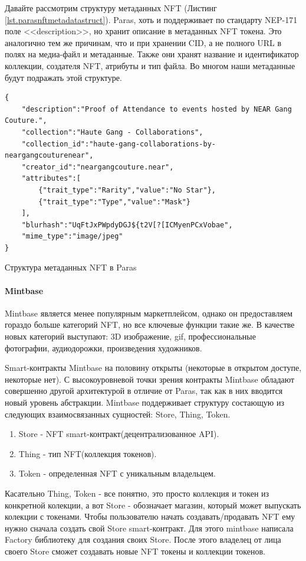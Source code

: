 Давайте рассмотрим структуру метаданных NFT (Листинг {\color{blue}\ref{lst.parasnftmetadatastruct}}). Paras, хоть и поддерживает по стандарту NEP-171 поле <<description>>, но хранит описание в метаданных NFT токена. Это аналогично тем же причинам, что и при хранении CID, а не полного URL в полях на медиа-файл и метаданные. Также они хранят название и идентификатор коллекции, создателя NFT, атрибуты и тип файла. Во многом наши метаданные будут подражать этой структуре.

\begin{listing}[H]
\begin{verbatim}
{
    "description":"Proof of Attendance to events hosted by NEAR Gang Couture.",
    "collection":"Haute Gang - Collaborations",
    "collection_id":"haute-gang-collaborations-by-neargangcouturenear",
    "creator_id":"neargangcouture.near",
    "attributes":[
        {"trait_type":"Rarity","value":"No Star"},
        {"trait_type":"Type","value":"Mask"}
    ],
    "blurhash":"UqFtJxPWpdyDGJ${t2V[?[ICMyenPCxVobae",
    "mime_type":"image/jpeg"
}
\end{verbatim}
\caption{Структура метаданных NFT в Paras}
\label{lst.parasnftmetadatastruct}
\end{listing}


\paragraph{Mintbase}

Mintbase является менее популярным маркетплейсом, однако он предоставляем гораздо больше категорий NFT, но все ключевые функции такие же. В качестве новых категорий выступают: 3D изображение, gif, профессиональные фотографии, аудиодорожки, произведения художников.

Smart-контракты Mintbase на половину открыты (некоторые в открытом доступе, некоторые нет)\cite{mintbasecontracts}. С высокоуровневой точки зрения контракты Mintbase обладают совершенно другой архитектурой в отличие от Paras, так как в них вводится новый уровень абстракции.
Mintbase поддерживает структуру состающую из следующих взаимосвязанных сущностей: Store, Thing, Token.
\begin{enumerate}
    \item Store - NFT smart-контракт(децентрализованное API).
    \item Thing - тип NFT(коллекция токенов).
    \item Token - определенная NFT с уникальным владельцем.
\end{enumerate}
Касательно Thing, Token - все понятно, это просто коллекция и токен из конкретной колекции, а вот Store - обозначает магазин, который может выпускать колекции с токенами.
Чтобы пользователю начать создавать/продавать NFT ему нужно сначала создать свой Store smart-контракт. Для этого mintbase написала Factory библиотеку для создания своих Store.
После этого владелец от лица своего Store сможет создавать новые NFT токены и коллекции токенов.

